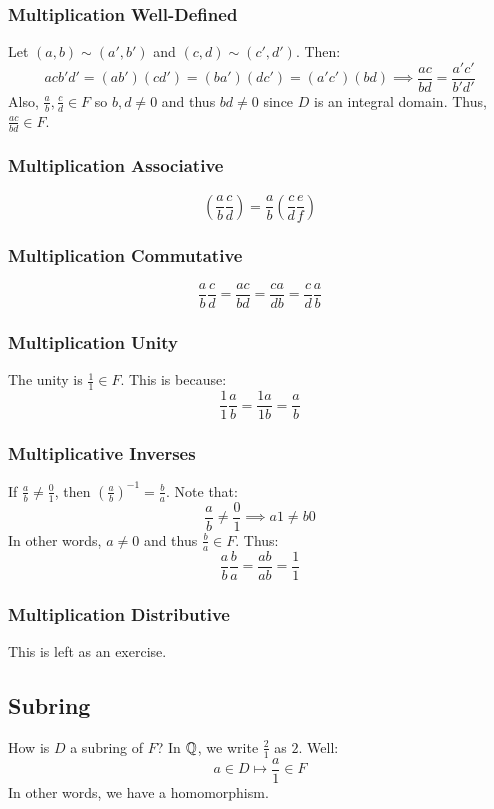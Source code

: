 \documentclass[letterpaper]{article}
\begin{document}
\subsubsection{Multiplication Well-Defined}
Let $(a, b) \sim (a', b')$ and $(c, d) \sim (c', d')$. Then:
\[acb'd' = (ab')(cd') = (ba')(dc') = (a'c')(bd) \implies \frac{ac}{bd} = \frac{a'c'}{b'd'}\]
Also, $\frac{a}{b}, \frac{c}{d} \in F$ so $b, d \neq 0$ and thus $bd \neq 0$ since $D$ is an integral domain. Thus, $\frac{ac}{bd} \in F$. 

\subsubsection{Multiplication Associative}
\[\left(\frac{a}{b} \frac{c}{d}\right) = \frac{a}{b} \left(\frac{c}{d} \frac{e}{f}\right)\]

\subsubsection{Multiplication Commutative}
\[\frac{a}{b} \frac{c}{d} = \frac{ac}{bd} = \frac{ca}{db} = \frac{c}{d} \frac{a}{b}\]

\subsubsection{Multiplication Unity}
The unity is $\frac{1}{1} \in F$. This is because: 
\[\frac{1}{1} \frac{a}{b} = \frac{1a}{1b} = \frac{a}{b}\]

\subsubsection{Multiplicative Inverses}
If $\frac{a}{b} \neq \frac{0}{1}$, then $\left(\frac{a}{b}\right)^{-1} = \frac{b}{a}$. Note that: 
\[\frac{a}{b} \neq \frac{0}{1} \implies a1 \neq b0\]
In other words, $a \neq 0$ and thus $\frac{b}{a} \in F$. Thus: 
\[\frac{a}{b} \frac{b}{a} = \frac{ab}{ab} = \frac{1}{1}\]

\subsubsection{Multiplication Distributive}
This is left as an exercise.

\subsection{Subring}
How is $D$ a subring of $F$? In $\mathbb{Q}$, we write $\frac{2}{1}$ as $2$. Well: 
\[a \in D \mapsto \frac{a}{1} \in F\]
In other words, we have a homomorphism.
\end{document}

